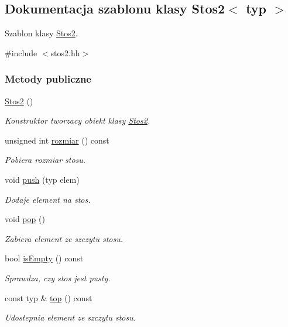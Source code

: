 \hypertarget{class_stos2}{\subsection{Dokumentacja szablonu klasy Stos2$<$ typ $>$}
\label{class_stos2}
}


Szablon klasy \hyperlink{class_stos2}{Stos2}.  




{\ttfamily \#include $<$stos2.\-hh$>$}

\subsubsection*{Metody publiczne}
\begin{DoxyCompactItemize}
\item 
\hyperlink{class_stos2_abaece5d8ea94f42f35a3695cfa06bb89}{Stos2} ()
\begin{DoxyCompactList}\small\item\em Konstruktor tworzacy obiekt klasy \hyperlink{class_stos2}{Stos2}. \end{DoxyCompactList}\item 
unsigned int \hyperlink{class_stos2_a2187459973616b1b8abd088070e0d6cb}{rozmiar} () const 
\begin{DoxyCompactList}\small\item\em Pobiera rozmiar stosu. \end{DoxyCompactList}\item 
void \hyperlink{class_stos2_afffdd4e2058a97345b38c548129c4a6c}{push} (typ elem)
\begin{DoxyCompactList}\small\item\em Dodaje element na stos. \end{DoxyCompactList}\item 
void \hyperlink{class_stos2_a3b3f04b66fb0eb2c72e2a585824d9798}{pop} ()
\begin{DoxyCompactList}\small\item\em Zabiera element ze szczytu stosu. \end{DoxyCompactList}\item 
bool \hyperlink{class_stos2_a5a3d8c0e89fba850c5133b544c0090c2}{is\-Empty} () const 
\begin{DoxyCompactList}\small\item\em Sprawdza, czy stos jest pusty. \end{DoxyCompactList}\item 
const typ \& \hyperlink{class_stos2_a9cf437785e4d58a2d3e0f709a2474962}{top} () const 
\begin{DoxyCompactList}\small\item\em Udostepnia element ze szczytu stosu. \end{DoxyCompactList}\end{DoxyCompactItemize}
